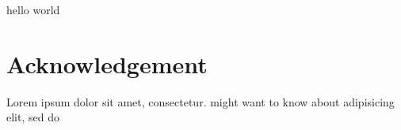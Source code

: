 \documentclass{bioinfo}
\begin{document}
%

hello world\cite{rongtian}
\section*{Acknowledgement}
Lorem ipsum dolor sit amet, consectetur.  \citealp{Boffelli03} might want to know about  adipisicing elit, sed do


%
%
%
%
%



\end{document}
